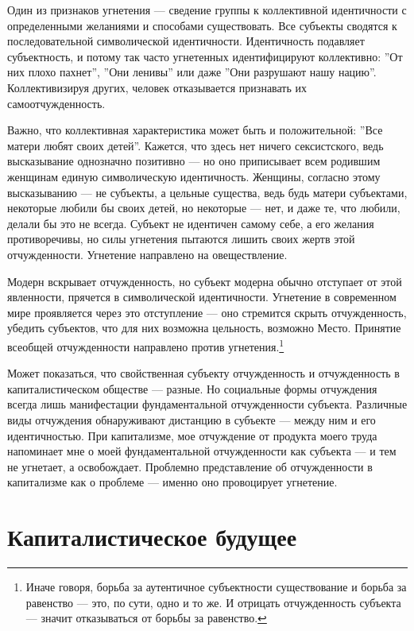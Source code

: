 \documentclass[12pt]{book}
\begin{document}
Один из признаков угнетения --- сведение группы к коллективной идентичности с определенными желаниями и способами существовать. Все субъекты сводятся к последовательной символической идентичности. Идентичность подавляет субъектность, и потому так часто угнетенных идентифицируют коллективно: ''От них плохо пахнет'', ''Они ленивы'' или даже ''Они разрушают нашу нацию''. Коллективизируя других, человек отказывается признавать их самоотчужденность.

Важно, что коллективная характеристика может быть и положительной: ''Все матери любят своих детей''. Кажется, что здесь нет ничего сексистского, ведь высказывание однозначно позитивно --- но оно приписывает всем родившим женщинам единую символическую идентичность. Женщины, согласно этому высказыванию --- не субъекты, а цельные существа, ведь будь матери субъектами, некоторые любили бы своих детей, но некоторые --- нет, и даже те, что любили, делали бы это не всегда. Субъект не идентичен самому себе, а его желания противоречивы, но силы угнетения пытаются лишить своих жертв этой отчужденности. Угнетение направлено на овеществление.

Модерн вскрывает отчужденность, но субъект модерна обычно отступает от этой явленности, прячется в символической идентичности. Угнетение в современном мире проявляется через это отступление --- оно стремится скрыть отчужденность, убедить субъектов, что для них возможна цельность, возможно Место. Принятие всеобщей отчужденности направлено против угнетения.\footnote{Иначе говоря, борьба за аутентичное субъектности существование и борьба за равенство --- это, по сути, одно и то же. И отрицать отчужденность субъекта --- значит отказываться от борьбы за равенство.}

Может показаться, что свойственная субъекту отчужденность и отчужденность в капиталистическом обществе --- разные. Но социальные формы отчуждения всегда лишь манифестации фундаментальной отчужденности субъекта. Различные виды отчуждения обнаруживают дистанцию в субъекте --- между ним и его идентичностью. При капитализме, мое отчуждение от продукта моего труда напоминает мне о моей фундаментальной отчужденности как субъекта --- и тем не угнетает, а освобождает. Проблемно представление об отчужденности в капитализме как о проблеме --- именно оно провоцирует угнетение.

\section{Капиталистическое будущее}
\end{document}
